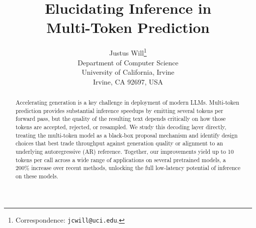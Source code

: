 \documentclass{article} %
\title{Elucidating Inference in \\ Multi-Token Prediction}
\author{Justus Will\thanks{Correspondence: \texttt{jcwill@uci.edu}.} \\
Department of Computer Science\\
University of California, Irvine\\
Irvine, CA 92697, USA
}
\begin{document}
\maketitle

\begin{abstract}
Accelerating generation is a key challenge in deployment of modern LLMs.
Multi-token prediction provides substantial inference speedups by emitting several tokens per forward pass, but the quality of the resulting text depends critically on how those tokens are accepted, rejected, or resampled.
We study this decoding layer directly, treating the multi-token model as a black-box proposal mechanism and identify design choices that best trade throughput against generation quality or alignment to an underlying autoregressive (AR) reference.
Together, our improvements yield up to 10 tokens per call across a wide range of applications on several pretrained models, a 200\% increase over recent methods, unlocking the full low-latency potential of inference on these models.
\end{abstract}
\end{document}
